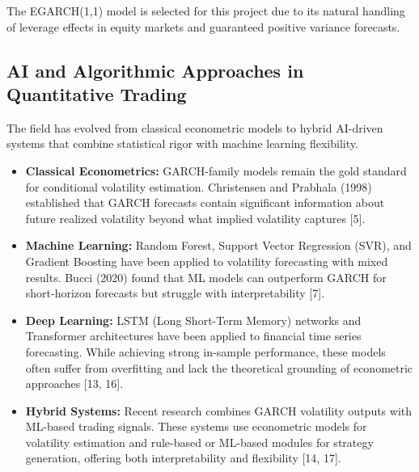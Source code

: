 \documentclass[12pt,a4paper]{article}
\begin{document}
The EGARCH(1,1) model is selected for this project due to its natural handling of leverage effects in equity markets and guaranteed positive variance forecasts.

\subsection{AI and Algorithmic Approaches in Quantitative Trading}

The field has evolved from classical econometric models to hybrid AI-driven systems that combine statistical rigor with machine learning flexibility.

\begin{itemize}
    \item \textbf{Classical Econometrics:} GARCH-family models remain the gold standard for conditional volatility estimation. Christensen and Prabhala (1998) established that GARCH forecasts contain significant information about future realized volatility beyond what implied volatility captures [5].

    \item \textbf{Machine Learning:} Random Forest, Support Vector Regression (SVR), and Gradient Boosting have been applied to volatility forecasting with mixed results. Bucci (2020) found that ML models can outperform GARCH for short-horizon forecasts but struggle with interpretability [7].

    \item \textbf{Deep Learning:} LSTM (Long Short-Term Memory) networks and Transformer architectures have been applied to financial time series forecasting. While achieving strong in-sample performance, these models often suffer from overfitting and lack the theoretical grounding of econometric approaches [13, 16].

    \item \textbf{Hybrid Systems:} Recent research combines GARCH volatility outputs with ML-based trading signals. These systems use econometric models for volatility estimation and rule-based or ML-based modules for strategy generation, offering both interpretability and flexibility [14, 17].
\end{itemize}
\end{document}
